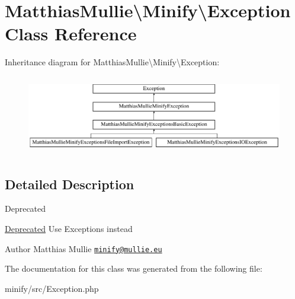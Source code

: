 \hypertarget{classMatthiasMullie_1_1Minify_1_1Exception}{}\section{Matthias\+Mullie\textbackslash{}Minify\textbackslash{}Exception Class Reference}
\label{classMatthiasMullie_1_1Minify_1_1Exception}
Inheritance diagram for Matthias\+Mullie\textbackslash{}Minify\textbackslash{}Exception\+:\begin{figure}[H]
\begin{center}
\leavevmode
\includegraphics[height=3.510972cm]{classMatthiasMullie_1_1Minify_1_1Exception}
\end{center}
\end{figure}


\subsection{Detailed Description}
\begin{DoxyRefDesc}{Deprecated}
\item[\hyperlink{deprecated__deprecated000001}{Deprecated}]Use Exceptions instead\end{DoxyRefDesc}


\begin{DoxyAuthor}{Author}
Matthias Mullie \href{mailto:minify@mullie.eu}{\tt minify@mullie.\+eu} 
\end{DoxyAuthor}


The documentation for this class was generated from the following file\+:\begin{DoxyCompactItemize}
\item 
minify/src/Exception.\+php\end{DoxyCompactItemize}
